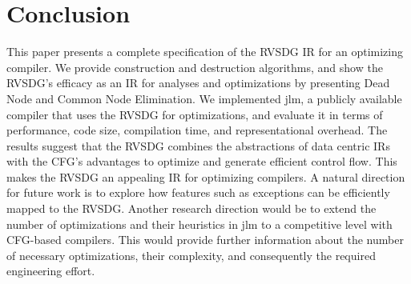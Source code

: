 \section{Conclusion}\label{sec:conclusion}

This paper presents a complete specification of the RVSDG IR for
an optimizing compiler. We provide construction and destruction algorithms, and show the RVSDG's
efficacy as an IR for analyses and optimizations by presenting Dead Node and Common Node
Elimination. We
implemented jlm, a publicly available~\cite{jlm} compiler that uses the RVSDG for optimizations, and
evaluate it in terms of performance, code size, compilation time, and representational overhead.
The results suggest that the RVSDG
combines the abstractions of data centric IRs with the CFG's advantages to optimize and generate
efficient control flow. This makes the RVSDG an appealing IR for optimizing compilers. A natural
direction for future work is to explore how features
such as exceptions can be efficiently mapped to the RVSDG. Another research direction would be to
extend the number of optimizations and their heuristics in jlm to a competitive level with CFG-based
compilers. This would provide further information about the number of necessary optimizations, their
complexity, and consequently the required engineering effort.



